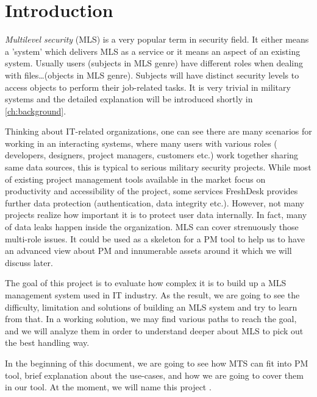 
\chapter{Introduction} %

\label{ch:introduction} %


\emph{Multilevel security} (MLS) is a very popular term in security field. 
It either means a 'system' which delivers MLS as a service or it means an aspect of an existing system. 
Usually users (subjects in MLS genre) have different roles when dealing with files\dots (objects in MLS genre).
Subjects will have distinct security levels to access objects to perform their job-related tasks.
It is very trivial in military systems and the detailed explanation will be introduced shortly in \autoref{ch:background}.

Thinking about IT-related organizations, one can see there are many scenarios for working in an interacting systems, where many users with various roles (\eg\,developers, designers, project managers, customers etc.) work together sharing same data sources, this is typical \eg to serious military security projects.
While most of existing project management tools available in the market focus on productivity and accessibility of the project, some services \eg FreshDesk provides further data protection (authentication, data integrity etc.). However, not many projects realize how important it is to protect user data internally. In fact, many of data leaks happen inside the organization. MLS can cover strenuously those multi-role issues. It could be used as a skeleton for a PM tool to help us to have an advanced view about PM and innumerable assets around it which we will discuss later.

The goal of this project is to evaluate how complex it is to build up a MLS management system used in IT industry.
As the result, we are going to see the difficulty, limitation and solutions of building an MLS system and try to learn from that.
In a working solution, we may find various paths to reach the goal, and we will analyze them in order to understand deeper about MLS to pick out the best handling way.

In the beginning of this document, we are going to see how MTS can fit into PM tool, brief explanation about the use-cases, and how we are going to cover them in our tool.
At the moment, we will name this project \myProject.

